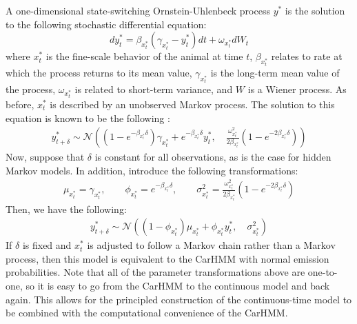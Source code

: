A one-dimensional state-switching Ornstein-Uhlenbeck process $y^*$ is the solution to the following stochastic differential equation:
%
$$dy^*_t = \beta_{x^*_t}(\gamma_{x^*_t} - y^*_t)dt + \omega_{x^*_t} dW_t$$
%
where $x^*_t$ is the fine-scale behavior of the animal at time $t$, $\beta_{x^*_t}$ relates to rate at which the process returns to its mean value, $\gamma_{x^*_t}$ is the long-term mean value of the process, $\omega_{x^*_t}$ is related to short-term variance, and $W$ is a Wiener process. As before, $x^*_t$ is described by an unobserved Markov process. The solution to this equation is known to be the following \cite{Michelot:2019}:
\begin{align*}
y^*_{t+\delta} \sim \mathcal{N}\left((1-e^{-\beta_{x^*_t}\delta})\gamma_{x^*_t} + e^{-\beta_{x^*_t}\delta} y^*_t,\quad \frac{\omega_{x^*_t}^2}{2\beta_{x^*_t}} (1-e^{-2\beta_{x^*_t}\delta})\right)
\end{align*}
Now, suppose that $\delta$ is constant for all observations, as is the case for hidden Markov models. In addition, introduce the following transformations:
\begin{align*}
\mu_{x^*_t} = \gamma_{x^*_t}, \qquad \phi_{x^*_t} = e^{-\beta_{x^*_t}\delta}, \qquad \sigma^2_{x^*_t} = \frac{\omega_{x^*_t}^2}{2\beta_{x^*_t}} (1-e^{-2\beta_{x^*_t}\delta})
\end{align*}
Then, we have the following:
\begin{align*}
y^*_{t+\delta} \sim \mathcal{N}\left((1-\phi_{x^*_t})\mu_{x^*_t} + \phi_{x^*_t} y^*_t,\quad \sigma_{x^*_t}^2 \right)
\end{align*}
%
If $\delta$ is fixed and $x^*_t$ is adjusted to follow a Markov chain rather than a Markov process, then this model is equivalent to the CarHMM with normal emission probabilities. Note that all of the parameter transformations above are one-to-one, so it is easy to go from the CarHMM to the continuous model and back again. This allows for the principled construction of the continuous-time model to be combined with the computational convenience of the CarHMM.

\fi

